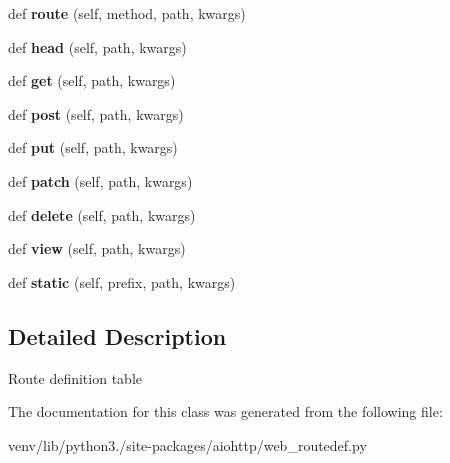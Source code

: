 \begin{DoxyCompactItemize}
\item 
\mbox{\label{classaiohttp_1_1web__routedef_1_1_route_table_def_a2fee6f5b1489b8597c689cf5c270a309}} 
def {\bfseries route} (self, method, path, kwargs)
\item 
\mbox{\label{classaiohttp_1_1web__routedef_1_1_route_table_def_acb7f2be9059ec92aa65bb637a7a4802b}} 
def {\bfseries head} (self, path, kwargs)
\item 
\mbox{\label{classaiohttp_1_1web__routedef_1_1_route_table_def_a5d5fe593efd98298f99b14567c40e5c8}} 
def {\bfseries get} (self, path, kwargs)
\item 
\mbox{\label{classaiohttp_1_1web__routedef_1_1_route_table_def_aea9cd4a5aaac5d8b19d6e127cf721b80}} 
def {\bfseries post} (self, path, kwargs)
\item 
\mbox{\label{classaiohttp_1_1web__routedef_1_1_route_table_def_a002172e9d2679dd51d3c2082bf98662c}} 
def {\bfseries put} (self, path, kwargs)
\item 
\mbox{\label{classaiohttp_1_1web__routedef_1_1_route_table_def_ab840a05d89fa76bc8b34d73a0caf82ac}} 
def {\bfseries patch} (self, path, kwargs)
\item 
\mbox{\label{classaiohttp_1_1web__routedef_1_1_route_table_def_af0541a3f1b439886a4cec4569441998e}} 
def {\bfseries delete} (self, path, kwargs)
\item 
\mbox{\label{classaiohttp_1_1web__routedef_1_1_route_table_def_a0047bf8d0c74bc1cad368ce90bdffead}} 
def {\bfseries view} (self, path, kwargs)
\item 
\mbox{\label{classaiohttp_1_1web__routedef_1_1_route_table_def_a0c7014929c130ab10c942bdbc1056189}} 
def {\bfseries static} (self, prefix, path, kwargs)
\end{DoxyCompactItemize}


\subsection{Detailed Description}
\begin{DoxyVerb}Route definition table\end{DoxyVerb}
 

The documentation for this class was generated from the following file\+:\begin{DoxyCompactItemize}
\item 
venv/lib/python3./site-\/packages/aiohttp/web\+\_\+routedef.\+py\end{DoxyCompactItemize}
